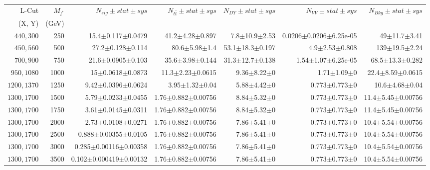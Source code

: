 \documentclass[]{article}
\begin{document}
\begin{table}
\begin{center}
\scriptsize{
\begin{tabular}{ |r|r|r|r|r|r|r|}
\hline 
L-Cut & $M_{l^*}$ & $N_{sig}\pm stat \pm sys $ &$N_{t\bar{t}}\pm stat \pm sys $ & $N_{DY}\pm stat \pm sys $ & $N_{VV}\pm stat \pm sys $ &$N_{Bkg}\pm stat \pm sys$\\
(X, Y) & (GeV) & && &&\\
\hline 
$440, 300$ & 250 & 15.4$\pm$0.117$\pm$0.0479 & 41.2$\pm$4.28$\pm$0.897 & 7.8$\pm$10.9$\pm$2.53 & 0.0206$\pm$0.0206$\pm$6.25e-05 & 49$\pm$11.7$\pm$3.41 \\
$450, 560$ & 500 & 27.2$\pm$0.128$\pm$0.114 & 80.6$\pm$5.98$\pm$1.4 & 53.1$\pm$18.3$\pm$0.197 & 4.9$\pm$2.53$\pm$0.808 & 139$\pm$19.5$\pm$2.24 \\
$700, 900$ & 750 & 21.6$\pm$0.0905$\pm$0.103 & 35.6$\pm$3.98$\pm$0.144 & 31.3$\pm$12.7$\pm$0.138 & 1.54$\pm$1.07$\pm$6.25e-05 & 68.5$\pm$13.3$\pm$0.282 \\
$950, 1080$ & 1000 & 15$\pm$0.0618$\pm$0.0873 & 11.3$\pm$2.23$\pm$0.0615 & 9.36$\pm$8.22$\pm$0 & 1.71$\pm$1.09$\pm$0 & 22.4$\pm$8.59$\pm$0.0615 \\
$1200, 1370$ & 1250 & 9.42$\pm$0.0396$\pm$0.0624 & 3.95$\pm$1.32$\pm$0.04 & 5.88$\pm$4.42$\pm$0 & 0.773$\pm$0.773$\pm$0 & 10.6$\pm$4.68$\pm$0.04 \\
$1300, 1700$ & 1500 & 5.79$\pm$0.0233$\pm$0.0455 & 1.76$\pm$0.882$\pm$0.00756 & 8.84$\pm$5.32$\pm$0 & 0.773$\pm$0.773$\pm$0 & 11.4$\pm$5.45$\pm$0.00756 \\
$1300, 1700$ & 1750 & 3.61$\pm$0.0145$\pm$0.0311 & 1.76$\pm$0.882$\pm$0.00756 & 8.84$\pm$5.32$\pm$0 & 0.773$\pm$0.773$\pm$0 & 11.4$\pm$5.45$\pm$0.00756 \\
$1300, 1700$ & 2000 & 2.73$\pm$0.0108$\pm$0.0271 & 1.76$\pm$0.882$\pm$0.00756 & 7.86$\pm$5.41$\pm$0 & 0.773$\pm$0.773$\pm$0 & 10.4$\pm$5.54$\pm$0.00756 \\
$1300, 1700$ & 2500 & 0.888$\pm$0.00355$\pm$0.0105 & 1.76$\pm$0.882$\pm$0.00756 & 7.86$\pm$5.41$\pm$0 & 0.773$\pm$0.773$\pm$0 & 10.4$\pm$5.54$\pm$0.00756 \\
$1300, 1700$ & 3000 & 0.285$\pm$0.00116$\pm$0.00358 & 1.76$\pm$0.882$\pm$0.00756 & 7.86$\pm$5.41$\pm$0 & 0.773$\pm$0.773$\pm$0 & 10.4$\pm$5.54$\pm$0.00756 \\
$1300, 1700$ & 3500 & 0.102$\pm$0.000419$\pm$0.00132 & 1.76$\pm$0.882$\pm$0.00756 & 7.86$\pm$5.41$\pm$0 & 0.773$\pm$0.773$\pm$0 & 10.4$\pm$5.54$\pm$0.00756 \\

\end{tabular}}
\end{center}
\end{table}
\end{document}
